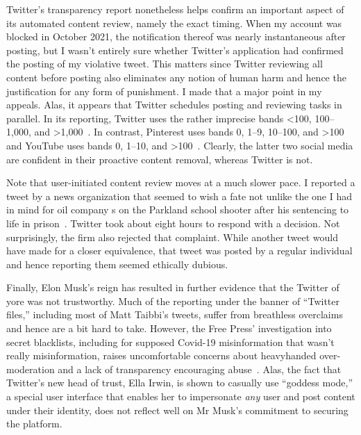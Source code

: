 Twitter's transparency report nonetheless helps confirm an important aspect of
its automated content review, namely the exact timing. When my account was
blocked in October 2021, the notification thereof was nearly instantaneous after
posting, but I wasn't entirely sure whether Twitter's application had confirmed
the posting of my violative tweet. This matters since Twitter reviewing all
content before posting also eliminates any notion of human harm and hence the
justification for any form of punishment. I made that a major point in my
appeals. Alas, it appears that Twitter schedules posting and reviewing tasks in
parallel. In its reporting, Twitter uses the rather imprecise bands <100,
100--1,000, and >1,000~\cite{Twitter2021}. In contrast, Pinterest uses bands 0,
1--9, 10--100, and >100~\cite{Pinterest2022} and YouTube uses bands 0, 1--10,
and >100~\cite{Google2022}. Clearly, the latter two social media are confident
in their proactive content removal, whereas Twitter is not.

Note that user-initiated content review moves at a much slower pace. I reported
a tweet by a news organization that seemed to wish a fate not unlike the one I
had in mind for oil company \CEO{}s on the Parkland school shooter after his
sentencing to life in prison~\cite{ShapiroDeliso2022}. Twitter took about eight
hours to respond with a decision. Not surprisingly, the firm also rejected that
complaint. While another tweet would have made for a closer equivalence, that
tweet was posted by a regular individual and hence reporting them seemed
ethically dubious.

Finally, Elon Musk's reign has resulted in further evidence that the Twitter of
yore was not trustworthy. Much of the reporting under the banner of ``Twitter
files,'' including most of Matt Taibbi's tweets, suffer from breathless
overclaims and hence are a bit hard to take. However, the Free Press'
investigation into secret blacklists, including for supposed Covid-19
misinformation that wasn't really misinformation, raises uncomfortable concerns
about heavyhanded over-moderation and a lack of transparency encouraging
abuse~\cite{WeissShrierea2022,Zweig2022}. Alas, the fact that Twitter's new head
of trust, Ella Irwin, is shown to casually use ``goddess mode,'' a special user
interface that enables her to impersonate \emph{any} user and post content under
their identity, does not reflect well on Mr Musk's commitment to securing the
platform.
